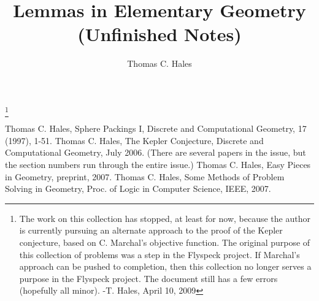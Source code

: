 \documentclass[11pt]{amsart}
\title{Lemmas in Elementary Geometry\\(Unfinished Notes)}
\author{Thomas C. Hales}
\begin{document}
\maketitle

\symbolfootnote[0]{\hfil\break}
\footnote{The work on this collection has stopped, at least for now, because the author is currently pursuing an alternate approach to the proof of the Kepler conjecture, based on C. Marchal's objective function.  The original purpose of this collection of problems was a step in the Flyspeck project.  If Marchal's approach can be pushed to completion, then this collection no longer serves a purpose in the Flyspeck project.  The document still has a few errors (hopefully all minor).   -T. Hales, April 10, 2009} %

 








\newpage
\begin{thebibliography}{CHMS94}
 Thomas C. Hales, Sphere Packings I,
    Discrete and Computational Geometry, 17 (1997), 1-51.
 Thomas C. Hales, The Kepler Conjecture, Discrete and
Computational Geometry, July 2006. (There are several papers in
the issue, but the section numbers run through the entire issue.)
 Thomas C. Hales, Easy Pieces in Geometry, preprint, 2007.
 Thomas C. Hales, Some Methods of Problem
Solving in Geometry, Proc. of Logic in Computer Science, IEEE, 2007.
\end{thebibliography}

{


}

\tableofcontents
\end{document}
